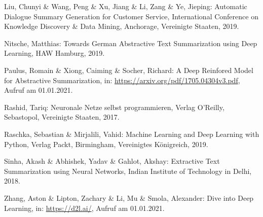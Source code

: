 \begin{thebibliography}{50}
Liu, Chunyi \& Wang, Peng \& Xu, Jiang \& Li, Zang \& Ye, Jieping: Automatic Dialogue Summary Generation for Customer Service, International Conference on Knowledge Discovery \& Data Mining, Anchorage, Vereinigte Staaten, 2019.

Nitsche, Matthias: Towards German Abstractive Text Summarization using Deep Learning, HAW Hamburg, 2019.

Paulus, Romain \& Xiong, Caiming \& Socher, Richard: A Deep Reinfored Model for Abstractive Summarization, in: \url{https://arxiv.org/pdf/1705.04304v3.pdf}, Aufruf am 01.01.2021.

Rashid, Tariq: Neuronale Netze selbst programmieren, Verlag O'Reilly, Sebastopol, Vereinigte Staaten, 2017.

Raschka, Sebastian \& Mirjalili, Vahid: Machine Learning and Deep Learning with Python, Verlag Packt, Birmingham, Vereinigtes Königreich, 2019.

Sinha, Akash \& Abhishek, Yadav \& Gahlot, Akshay: Extractive Text Summarization using Neural Networks, Indian Institute of Technology in Delhi, 2018.

Zhang, Aston \& Lipton, Zachary \& Li, Mu \& Smola, Alexander: Dive into Deep Learning, in: \url{https://d2l.ai/}, Aufruf am 01.01.2021.

\end{thebibliography}
